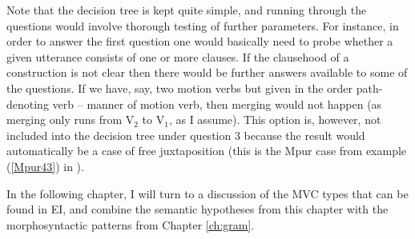 Note that the decision tree is kept quite simple, and running through the questions would involve thorough testing of further parameters. For instance, in order to answer the first question one would basically need to probe whether a given utterance consists of one or more clauses. If the clausehood of a construction is not clear then there would be further answers available to some of the questions. If we have, say, two motion verbs but given in the order path-denoting verb -- manner of motion verb, then merging would not happen (as merging only runs from V$_2$ to V$_1$, as I assume). This option is, however, not included into the decision tree under question 3 because the result would automatically be a case of free juxtaposition (this is the Mpur case from example (\ref{Mpur43}) in ).

In the following chapter, I will turn to a discussion of the MVC types that can be found in EI, and combine the semantic hypotheses from this chapter with the morphosyntactic patterns from Chapter \ref{ch:gram}.
